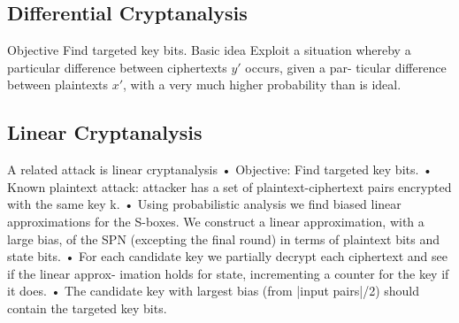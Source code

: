 \subsection{Differential Cryptanalysis}
Objective
Find targeted key bits.
Basic idea
Exploit a situation whereby a particular difference between ciphertexts $y\prime$ occurs, given a par- ticular difference between plaintexts $x\prime$, with a very much higher probability than is ideal.
\subsection{Linear Cryptanalysis}
A related attack is linear cryptanalysis
• Objective: Find targeted key bits.
• Known plaintext attack: attacker has a set of plaintext-ciphertext pairs encrypted with
the same key k.
• Using probabilistic analysis we find biased linear approximations for the S-boxes. We construct a linear approximation, with a large bias, of the SPN (excepting the final round) in terms of plaintext bits and state bits.
• For each candidate key we partially decrypt each ciphertext and see if the linear approx- imation holds for state, incrementing a counter for the key if it does.
• The candidate key with largest bias (from |input pairs|/2) should contain the targeted key bits.
